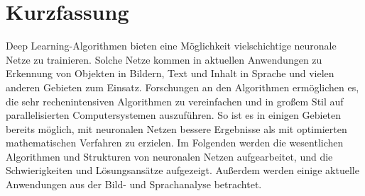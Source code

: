 \chapter{Kurzfassung}

Deep Learning-Algorithmen bieten eine Möglichkeit vielschichtige neuronale Netze zu trainieren. Solche Netze kommen in aktuellen Anwendungen zu Erkennung von Objekten in Bildern, Text und Inhalt in Sprache und vielen anderen Gebieten zum Einsatz. Forschungen an den Algorithmen ermöglichen es, die sehr rechenintensiven Algorithmen zu vereinfachen und in großem Stil auf parallelisierten Computersystemen auszuführen. So ist es in einigen Gebieten bereits möglich, mit neuronalen Netzen bessere Ergebnisse als mit optimierten mathematischen Verfahren zu erzielen. Im Folgenden werden die wesentlichen Algorithmen und Strukturen von neuronalen Netzen aufgearbeitet, und die Schwierigkeiten und Lösungsansätze aufgezeigt. Außerdem werden einige aktuelle Anwendungen aus der Bild- und Sprachanalyse betrachtet.